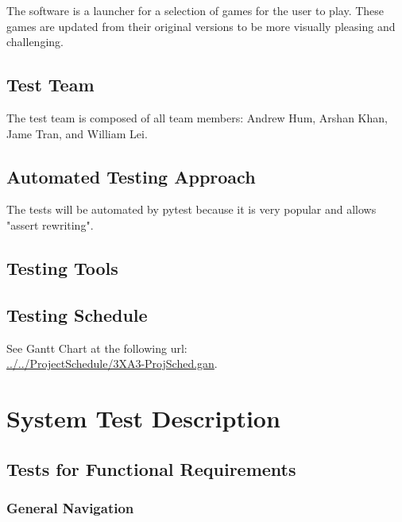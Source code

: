 \documentclass[12pt, titlepage]{article}
\begin{document}
The software is a launcher for a selection of games for the user to play. These games are updated from their original versions to be more visually pleasing and challenging.

\subsection{Test Team}

The test team is composed of all team members: Andrew Hum, Arshan Khan, Jame Tran, and William Lei.

\subsection{Automated Testing Approach}

The tests will be automated by pytest because it is very popular and allows "assert rewriting".

\subsection{Testing Tools}

\subsection{Testing Schedule}
		
See Gantt Chart at the following url: \\
\href{run:../../ProjectSchedule/3XA3-ProjSched.gan}{../../ProjectSchedule/3XA3-ProjSched.gan}. 

\section{System Test Description}
	
\subsection{Tests for Functional Requirements}

\subsubsection{General Navigation}
\end{document}
